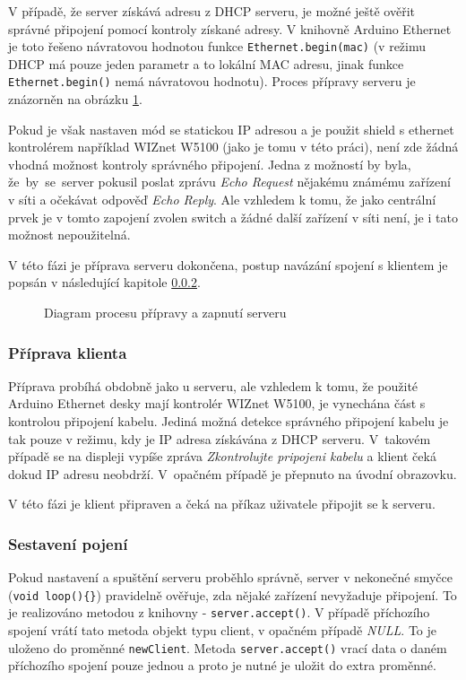 V případě, že server získává adresu z DHCP serveru, je možné ještě ověřit správné připojení pomocí kontroly získané adresy. V knihovně Arduino Ethernet \cite{EthLib} je toto řešeno návratovou hodnotou funkce \texttt{Ethernet.begin(mac)} (v režimu DHCP má pouze jeden parametr a to lokální MAC adresu, jinak funkce \texttt{Ethernet.begin()} nemá návratovou hodnotu). Proces přípravy serveru je znázorněn na obrázku \ref{fig:flow:serverStartUp}.

Pokud je však nastaven mód se statickou IP adresou a je použit shield s ethernet kontrolérem například WIZnet W5100 (jako je tomu v této práci), není zde žádná vhodná možnost kontroly správného připojení. Jedna z možností by byla, že~by~se~server pokusil poslat zprávu \textit{Echo Request} nějakému známému zařízení v síti a očekávat odpověď \textit{Echo Reply}. Ale vzhledem k tomu, že jako centrální prvek je v tomto zapojení zvolen switch a žádné další zařízení v síti není, je i tato možnost nepoužitelná.

V této fázi je příprava serveru dokončena, postup navázání spojení s klientem je popsán v následující kapitole \ref{sec:connection_communication}.

\begin{figure}
  \centering
  
  \caption{\label{fig:flow:serverStartUp} Diagram procesu přípravy a zapnutí serveru}
\end{figure}


\subsubsection{Příprava klienta}
Příprava probíhá obdobně jako u serveru, ale vzhledem k tomu, že použité Arduino Ethernet desky mají kontrolér WIZnet W5100, je vynechána část s kontrolou připojení kabelu. Jediná možná detekce správného připojení kabelu je tak pouze v režimu, kdy je IP adresa získávána z DHCP serveru. V~takovém případě se na displeji vypíše zpráva \textit{Zkontrolujte pripojeni kabelu} a klient čeká dokud IP adresu neobdrží. V~opačném případě je přepnuto na úvodní obrazovku.

V této fázi je klient připraven a čeká na příkaz uživatele připojit se k serveru.

\clearpage
\subsubsection{Sestavení pojení}
\label{sec:connection_communication}
Pokud nastavení a spuštění serveru proběhlo správně, server v nekonečné smyčce (\texttt{void loop()\{\}}) pravidelně ověřuje, zda nějaké zařízení nevyžaduje připojení. To je realizováno metodou z knihovny \cite{EthLib} - \texttt{server.accept()}. V případě příchozího spojení vrátí tato metoda objekt typu client, v opačném případě \textit{NULL}. To je uloženo do proměnné \texttt{newClient}. Metoda \texttt{server.accept()} vrací data o daném příchozího spojení pouze jednou a proto je nutné je uložit do extra proměnné.

